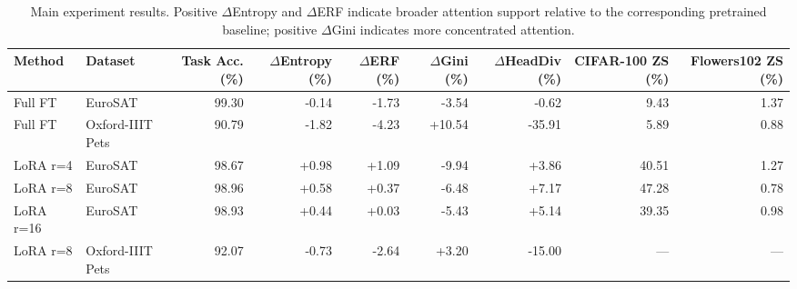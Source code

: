 \begin{table}[t]
\centering
\caption{Main experiment results. Positive $\Delta$Entropy and $\Delta$ERF indicate broader attention support relative to the corresponding pretrained baseline; positive $\Delta$Gini indicates more concentrated attention.}
\label{tab:main-results}
\small
\begin{tabular}{llrrrrrrr}
\toprule
Method & Dataset & Task Acc. (\%) & $\Delta$Entropy (\%) & $\Delta$ERF (\%) & $\Delta$Gini (\%) & $\Delta$HeadDiv (\%) & CIFAR-100 ZS (\%) & Flowers102 ZS (\%) \\
\midrule
Full FT & EuroSAT & 99.30 & -0.14 & -1.73 & -3.54 & -0.62 & 9.43 & 1.37 \\
Full FT & Oxford-IIIT Pets & 90.79 & -1.82 & -4.23 & +10.54 & -35.91 & 5.89 & 0.88 \\
LoRA r=4 & EuroSAT & 98.67 & +0.98 & +1.09 & -9.94 & +3.86 & 40.51 & 1.27 \\
LoRA r=8 & EuroSAT & 98.96 & +0.58 & +0.37 & -6.48 & +7.17 & 47.28 & 0.78 \\
LoRA r=16 & EuroSAT & 98.93 & +0.44 & +0.03 & -5.43 & +5.14 & 39.35 & 0.98 \\
LoRA r=8 & Oxford-IIIT Pets & 92.07 & -0.73 & -2.64 & +3.20 & -15.00 & --- & --- \\
\bottomrule
\end{tabular}
\end{table}
